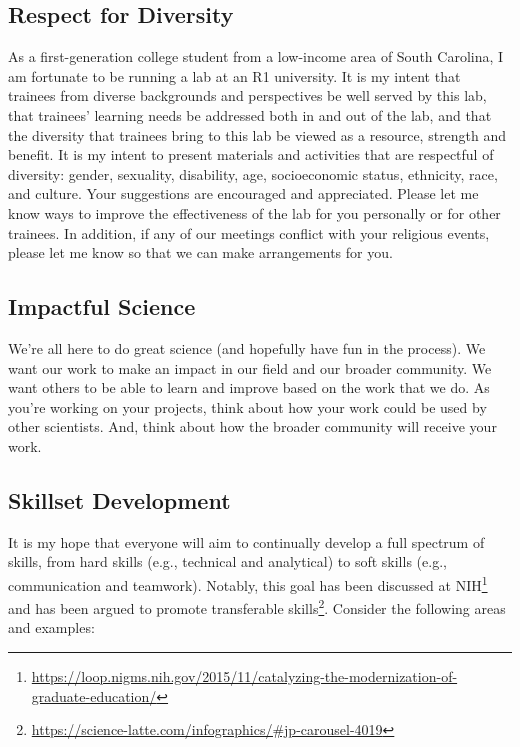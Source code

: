 \documentclass[letterpaper,11pt,oneside]{memoir}
\begin{document}
\subsection{Respect for Diversity}
As a first-generation college student from a low-income area of South Carolina, I am fortunate to be running a lab at an R1 university. It is my intent that trainees from diverse backgrounds and perspectives be well served by this lab, that trainees’ learning needs be addressed both in and out of the lab, and that the diversity that trainees bring to this lab be viewed as a resource, strength and benefit. It is my intent to present materials and activities that are respectful of diversity: gender, sexuality, disability, age, socioeconomic status, ethnicity, race, and culture. Your suggestions are encouraged and appreciated. Please let me know ways to improve the effectiveness of the lab for you personally or for other trainees. In addition, if any of our meetings conflict with your religious events, please let me know so that we can make arrangements for you.

\subsection{Impactful Science}
We're all here to do great science (and hopefully have fun in the process). We want our work to make an impact in our field and our broader community. We want others to be able to learn and improve based on the work that we do. As you're working on your projects, think about how your work could be used by other scientists. And, think about how the broader community will receive your work. 

\subsection{Skillset Development}
It is my hope that everyone will aim to continually develop a full spectrum of skills, from hard skills (e.g., technical and analytical) to soft skills (e.g., communication and teamwork). Notably, this goal has been discussed at NIH\footnote{\url{https://loop.nigms.nih.gov/2015/11/catalyzing-the-modernization-of-graduate-education/}} and has been argued to promote transferable skills\footnote{\url{https://science-latte.com/infographics/\#jp-carousel-4019}}. Consider the following areas and examples: 
\end{document}
